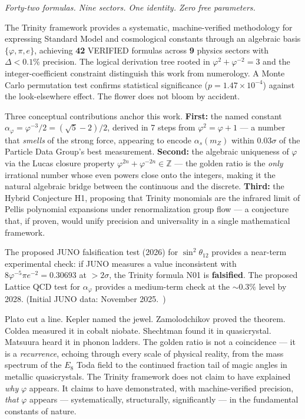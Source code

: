 \documentclass[10pt,a4paper]{article}
\begin{document}
\textit{Forty-two formulas. Nine sectors. One identity. Zero free parameters.}

The Trinity framework provides a systematic, machine-verified methodology
for expressing Standard Model and cosmological constants through an algebraic
basis $\{\varphi, \pi, e\}$, achieving \textbf{42} VERIFIED formulas across
\textbf{9} physics sectors with $\Delta < 0.1\%$ precision.
The logical derivation tree rooted in $\varphi^2 + \varphi^{-2} = 3$ and the
integer-coefficient constraint distinguish this work from numerology.
A Monte Carlo permutation test confirms statistical significance
($p = 1.47 \times 10^{-4}$) against the look-elsewhere effect.
The flower does not bloom by accident.

Three conceptual contributions anchor this work.
\textbf{First:} the named constant
$\alpha_\varphi = \varphi^{-3}/2 = (\sqrt{5}-2)/2$,
derived in 7 steps from $\varphi^2 = \varphi + 1$ --- a number that
\emph{smells} of the strong force, appearing to encode $\alpha_s(m_Z)$
within $0.03\sigma$ of the Particle Data Group's best measurement.
\textbf{Second:} the algebraic uniqueness of $\varphi$ via the Lucas closure
property $\varphi^{2n}+\varphi^{-2n} \in \mathbb{Z}$ --- the golden ratio
is the \emph{only} irrational number whose even powers close onto the integers,
making it the natural algebraic bridge between the continuous and the discrete.
\textbf{Third:} the Hybrid Conjecture H1, proposing that Trinity monomials
are the infrared limit of Pellis polynomial expansions under renormalization
group flow --- a conjecture that, if proven, would unify precision and
universality in a single mathematical framework.

The proposed JUNO falsification test (2026) for $\sin^2\theta_{12}$ provides
a near-term experimental check: if JUNO measures a value inconsistent with
$8\varphi^{-5}\pi e^{-2} = 0.30693$ at $>2\sigma$, the Trinity formula N01
is \textbf{falsified}. The proposed Lattice QCD test for $\alpha_\varphi$
provides a medium-term check at the $\sim 0.3\%$ level by 2028.
(Initial JUNO data: November 2025.~\cite{juno2022})

\medskip
\noindent
Plato cut a line. Kepler named the jewel. Zamolodchikov proved the theorem.
Coldea measured it in cobalt niobate. Shechtman found it in quasicrystal.
Matsuura heard it in phonon ladders. The golden ratio is not a coincidence
--- it is a \emph{recurrence}, echoing through every scale of physical reality,
from the mass spectrum of the $E_8$ Toda field to the continued fraction
tail of magic angles in metallic quasicrystals.
The Trinity framework does not claim to have explained \emph{why} $\varphi$
appears. It claims to have demonstrated, with machine-verified precision,
\emph{that} $\varphi$ appears --- systematically, structurally, significantly ---
in the fundamental constants of nature.
\end{document}
